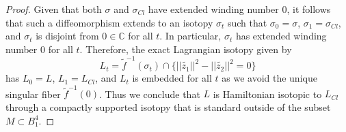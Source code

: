 \documentclass[10pt,a4paper]{amsart}
\newcommand{\C}{\mathbb{C}}
\newcommand{\sse}{\subset}
\newcommand{\wt}{\widetilde}
\begin{document}
\begin{proof}
Given that both $\sigma$ and $\sigma_{Cl}$ have extended winding number $0$, it follows that such a diffeomorphism extends to an isotopy $\sigma_t$ such that $\sigma_0=\sigma$, $\sigma_1=\sigma_{Cl}$, and $\sigma_t$ is disjoint from $0\in \C$ for all $t$. In particular, $\sigma_t$ has extended winding number $0$ for all $t$. Therefore, the exact Lagrangian isotopy given by 
$$L_t = \tilde{f}^{-1}(\sigma_t)\cap \{||\wt{z_1}||^2-||\wt{z_2}||^2=0\}$$ 
has $L_0=L$, $L_1=L_{Cl}$, and $L_t$ is embedded for all $t$ as we avoid the unique singular fiber $\tilde{f}^{-1}(0)$. Thus we conclude that $L$ is Hamiltonian isotopic to $L_{Cl}$ through a compactly supported isotopy that is standard outside of the subset $M\sse B^4_1$.
\end{proof}
\end{document}
